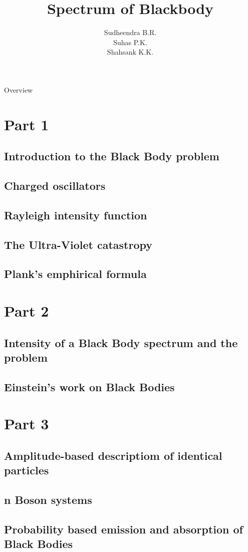 \documentclass[aspectratio=169]{beamer}
\title{Spectrum of Blackbody}
\institute{{\footnotesize Guided by V.H. Belvadi} \\ Yuvaraja's College, Mysuru}
\author{Sudheendra B.R. \\ Suhas P.K. \\ Shahsank K.K.}
\date{}
\begin{document}
\begin{frame}[noframenumbering]
	\titlepage
\end{frame}

\begin{frame}[noframenumbering]{Overview}
	\begin{multicols}{2}
		\tableofcontents[sections={1}]

		\columnbreak

		\tableofcontents[sections={2-3}]
	\end{multicols}
\end{frame}

\section{Part 1}
\subsection{Introduction to the Black Body problem}

\subsection{Charged oscillators}
 
\subsection{Rayleigh intensity function}
 
\subsection{The Ultra-Violet catastropy} 

\subsection{Plank's emphirical formula}

\section{Part 2}
\subsection{Intensity of a Black Body spectrum and the problem}

\subsection{Einstein's work on Black Bodies}

\section{Part 3}
\subsection{Amplitude-based descriptiom of identical particles}

\subsection{n Boson systems}

\subsection{Probability based emission and absorption of Black Bodies}
\end{document}
